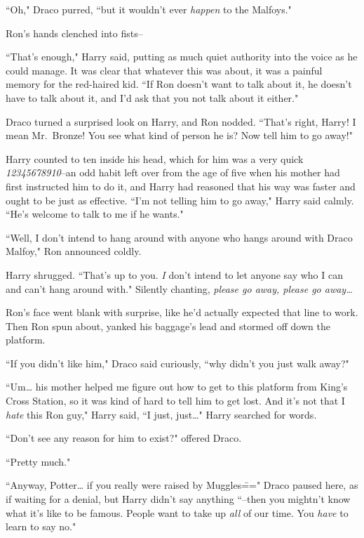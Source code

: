 ``Oh," Draco purred, ``but it wouldn't ever \emph{happen} to the Malfoys."

Ron's hands clenched into fists\---

``That's enough," Harry said, putting as much quiet authority into the voice as he could manage. It was clear that whatever this was about, it was a painful memory for the red-haired kid. ``If Ron doesn't want to talk about it, he doesn't have to talk about it, and I'd ask that you not talk about it either."

Draco turned a surprised look on Harry, and Ron nodded. ``That's right, Harry! I mean Mr.~Bronze! You see what kind of person he is? Now tell him to go away!"

Harry counted to ten inside his head, which for him was a very quick \emph{12345678910}\---an odd habit left over from the age of five when his mother had first instructed him to do it, and Harry had reasoned that his way was faster and ought to be just as effective. ``I'm not telling him to go away," Harry said calmly. ``He's welcome to talk to me if he wants."

``Well, I don't intend to hang around with anyone who hangs around with Draco Malfoy," Ron announced coldly.

Harry shrugged. ``That's up to you. \emph{I} don't intend to let anyone say who I can and can't hang around with." Silently chanting, \emph{please go away, please go away{\ldots}}

Ron's face went blank with surprise, like he'd actually expected that line to work. Then Ron spun about, yanked his baggage's lead and stormed off down the platform.

``If you didn't like him," Draco said curiously, ``why didn't you just walk away?"

``Um{\ldots} his mother helped me figure out how to get to this platform from King's Cross Station, so it was kind of hard to tell him to get lost. And it's not that I \emph{hate} this Ron guy," Harry said, ``I just, just{\ldots}" Harry searched for words.

``Don't see any reason for him to exist?" offered Draco.

``Pretty much."

``Anyway, Potter{\ldots} if you really were raised by Muggles\===" Draco paused here, as if waiting for a denial, but Harry didn't say anything ``\---then you mightn't know what it's like to be famous. People want to take up \emph{all} of our time. You \emph{have} to learn to say no."

